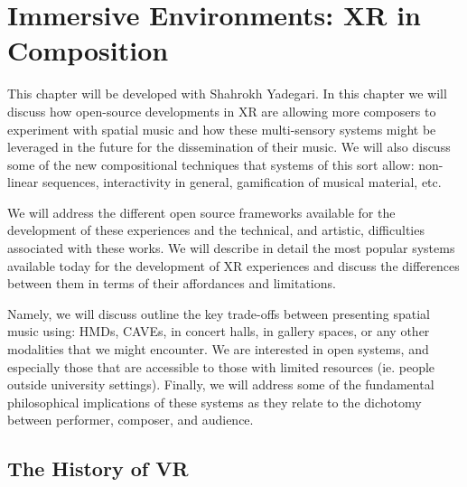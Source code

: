 \chapter{Immersive Environments: XR in Composition}
\label{ch:xr-mus}





This chapter will be developed with Shahrokh Yadegari. In this chapter we will discuss how open-source developments in XR are allowing more composers to experiment with spatial music and how these multi-sensory systems might be leveraged in the future for the dissemination of their music. We will also discuss some of the new compositional techniques that systems of this sort allow: non-linear sequences, interactivity in general, gamification of musical material, etc. 

We will address the different open source frameworks available for the development of these experiences and the technical, and artistic, difficulties associated with these works. We will describe in detail the most popular systems available today for the development of XR experiences and discuss the differences between them in terms of their affordances and limitations.

Namely, we will discuss outline the key trade-offs between presenting spatial music using: HMDs, CAVEs, in concert halls, in gallery spaces, or any other modalities that we might encounter. We are interested in open systems, and especially those that are accessible to those with limited resources (ie. people outside university settings). Finally, we will address some of the fundamental philosophical implications of these systems as they relate to the dichotomy between performer, composer, and audience. 

\section{The History of VR}

